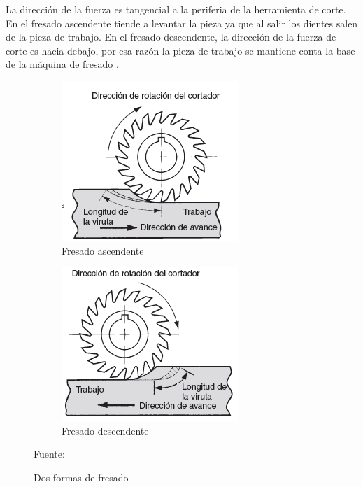 La dirección de la fuerza es tangencial a la periferia de la herramienta de corte. En el fresado ascendente tiende a levantar la pieza ya que al salir los dientes salen de la pieza de trabajo. En el fresado descendente, la dirección de la fuerza de corte es hacia debajo, por esa razón la pieza de trabajo se mantiene conta la base de la máquina de fresado \citep{groover2007fundamentals}. 
\begin{figure}[hbt]
    \centering
    \begin{subfigure}{0.4\textwidth}
        \centering
        \includegraphics[width=0.9\linewidth]{Cap1_FormulaciondelProyecto/Figuras/fresadoascendente.PNG}
        \caption{Fresado ascendente}
        \label{fig:Fresadoascendente}
    \end{subfigure} 
    \begin{subfigure}{0.4\textwidth}
        \centering  
        \includegraphics[width=0.9\linewidth]{Cap1_FormulaciondelProyecto/Figuras/fresadodescendente.PNG}
        \caption{Fresado descendente}
        \label{fig:Fresadodescendente}
    \end{subfigure}
    
    \caption{Dos formas de fresado}{Fuente: \citep{groover2007fundamentals}}
    \label{fig:formaFresadoperiferico}
\end{figure}

